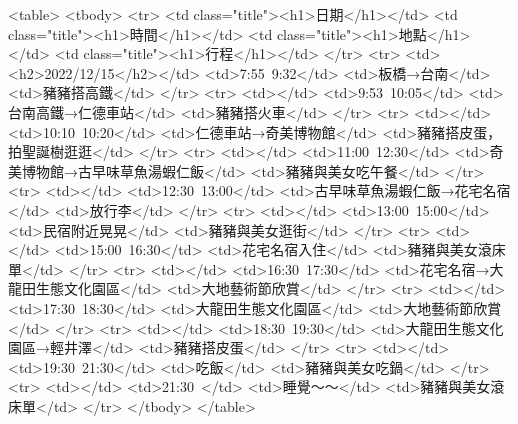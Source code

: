 <table>
<tbody>
  <tr>
    <td class="title"><h1>日期</h1></td>
    <td class="title"><h1>時間</h1></td>
    <td class="title"><h1>地點</h1></td>
    <td class="title"><h1>行程</h1></td>
  </tr>
  <tr>
    <td><h2>2022/12/15</h2></td>
    <td>7:55~9:32</td>
    <td>板橋→台南</td>
    <td>豬豬搭高鐵</td>
  </tr>
  <tr>
    <td></td>
    <td>9:53~10:05</td>
    <td>台南高鐵→仁德車站</td>
    <td>豬豬搭火車</td>
  </tr>
  <tr>
    <td></td>
    <td>10:10~10:20</td>
    <td>仁德車站→奇美博物館</td>
    <td>豬豬搭皮蛋，拍聖誕樹逛逛</td>
  </tr>
  <tr>
    <td></td>
    <td>11:00~12:30</td>
    <td>奇美博物館→古早味草魚湯蝦仁飯</td>
    <td>豬豬與美女吃午餐</td>
  </tr>
  <tr>
    <td></td>
    <td>12:30~13:00</td>
    <td>古早味草魚湯蝦仁飯→花宅名宿</td>
    <td>放行李</td>
  </tr>
  <tr>
    <td></td>
    <td>13:00~15:00</td>
    <td>民宿附近晃晃</td>
    <td>豬豬與美女逛街</td>
  </tr>
  <tr>
    <td></td>
    <td>15:00~16:30</td>
    <td>花宅名宿入住</td>
    <td>豬豬與美女滾床單</td>
  </tr>
  <tr>
    <td></td>
    <td>16:30~17:30</td>
    <td>花宅名宿→大龍田生態文化園區</td>
    <td>大地藝術節欣賞</td>
  </tr>
  <tr>
    <td></td>
    <td>17:30~18:30</td>
    <td>大龍田生態文化園區</td>
    <td>大地藝術節欣賞</td>
  </tr>
  <tr>
    <td></td>
    <td>18:30~19:30</td>
    <td>大龍田生態文化園區→輕井澤</td>
    <td>豬豬搭皮蛋</td>
  </tr>
  <tr>
    <td></td>
    <td>19:30~21:30</td>
    <td>吃飯</td>
    <td>豬豬與美女吃鍋</td>
  </tr>
  <tr>
    <td></td>
    <td>21:30~</td>
    <td>睡覺～～</td>
    <td>豬豬與美女滾床單</td>
  </tr>
</tbody>
</table>